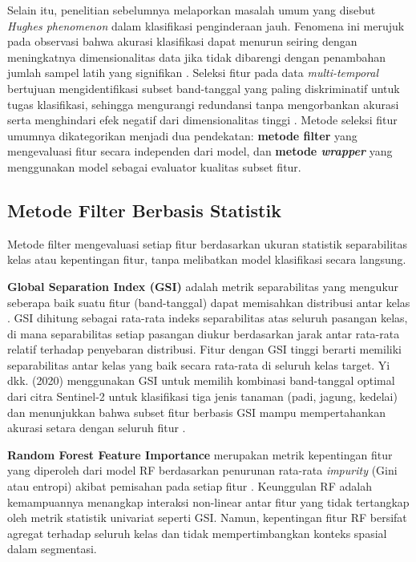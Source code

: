 Selain itu, penelitian sebelumnya melaporkan masalah umum yang disebut \textit{Hughes phenomenon} dalam klasifikasi penginderaan jauh. Fenomena ini merujuk pada observasi bahwa akurasi klasifikasi dapat menurun seiring dengan meningkatnya dimensionalitas data jika tidak dibarengi dengan penambahan jumlah sampel latih yang signifikan \cite{yang2020}.
Seleksi fitur pada data \textit{multi-temporal} bertujuan mengidentifikasi subset band-tanggal yang paling diskriminatif untuk tugas klasifikasi, sehingga mengurangi redundansi tanpa mengorbankan akurasi serta menghindari efek negatif dari dimensionalitas tinggi \cite{rs12010162}.
Metode seleksi fitur umumnya dikategorikan menjadi dua pendekatan: \textbf{metode filter} yang mengevaluasi fitur secara independen dari model, dan \textbf{metode \textit{wrapper}} yang menggunakan model sebagai evaluator kualitas subset fitur.

\subsection{Metode Filter Berbasis Statistik}
Metode filter mengevaluasi setiap fitur berdasarkan ukuran statistik separabilitas kelas atau kepentingan fitur, tanpa melibatkan model klasifikasi secara langsung.

\textbf{Global Separation Index (GSI)} adalah metrik separabilitas yang mengukur seberapa baik suatu fitur (band-tanggal) dapat memisahkan distribusi antar kelas \cite{rs12010162}.
GSI dihitung sebagai rata-rata indeks separabilitas atas seluruh pasangan kelas, di mana separabilitas setiap pasangan diukur berdasarkan jarak antar rata-rata relatif terhadap penyebaran distribusi.
Fitur dengan GSI tinggi berarti memiliki separabilitas antar kelas yang baik secara rata-rata di seluruh kelas target.
Yi dkk. (2020) menggunakan GSI untuk memilih kombinasi band-tanggal optimal dari citra Sentinel-2 untuk klasifikasi tiga jenis tanaman (padi, jagung, kedelai) dan menunjukkan bahwa subset fitur berbasis GSI mampu mempertahankan akurasi setara dengan seluruh fitur \cite{rs12010162}.

\textbf{Random Forest Feature Importance} merupakan metrik kepentingan fitur yang diperoleh dari model RF berdasarkan penurunan rata-rata \textit{impurity} (Gini atau entropi) akibat pemisahan pada setiap fitur \cite{yi2020}.
Keunggulan RF adalah kemampuannya menangkap interaksi non-linear antar fitur yang tidak tertangkap oleh metrik statistik univariat seperti GSI.
Namun, kepentingan fitur RF bersifat agregat terhadap seluruh kelas dan tidak mempertimbangkan konteks spasial dalam segmentasi.

